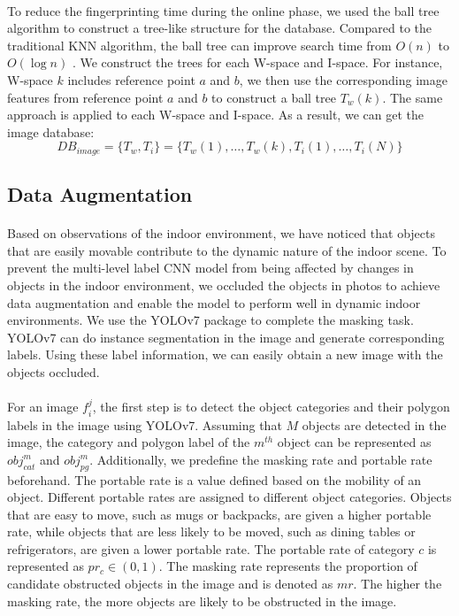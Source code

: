 \documentclass[a4paper,12pt]{report}
\begin{document}
\paragraph{}
To reduce the fingerprinting time during the online phase, we used the ball tree algorithm to construct a tree-like structure for the database. Compared to the traditional KNN algorithm, the ball tree can improve search time from $O(n)$ to $O(\log n)$ \cite{bhatia2010survey}. We construct the trees for each W-space and I-space. For instance, W-space $k$ includes reference point $a$ and $b$, we then use the corresponding image features from reference point $a$ and $b$ to construct a ball tree $T_w(k)$. The same approach is applied to each W-space and I-space. As a result, we can get the image database:
\begin{equation}
    \label{Eq:DB_image}
    DB_{image}=\{T_w,T_i\}=\{T_w(1),\dots,T_w(k),T_i(1),\dots,T_i(N)\}
\end{equation}
 
\subsection{Data Augmentation}
\paragraph{}
Based on observations of the indoor environment, we have noticed that objects that are easily movable contribute to the dynamic nature of the indoor scene. To prevent the multi-level label CNN model from being affected by changes in objects in the indoor environment, we occluded the objects in photos to achieve data augmentation and enable the model to perform well in dynamic indoor environments. We use the YOLOv7 \cite{wang2023yolov7} package to complete the masking task. YOLOv7 can do instance segmentation in the image and generate corresponding labels. Using these label information, we can easily obtain a new image with the objects occluded.
\paragraph{}
For an image $f_i^j$, the first step is to detect the object categories and their polygon labels in the image using YOLOv7. Assuming that $M$ objects are detected in the image, the category and polygon label of the $m^{th}$ object can be represented as $obj_{cat}^m$ and $obj_{pg}^m$. Additionally, we predefine the masking rate and portable rate beforehand. The portable rate is a value defined based on the mobility of an object. Different portable rates are assigned to different object categories. Objects that are easy to move, such as mugs or backpacks, are given a higher portable rate, while objects that are less likely to be moved, such as dining tables or refrigerators, are given a lower portable rate. The portable rate of category $c$ is represented as $pr_c\in(0,1)$. The masking rate represents the proportion of candidate obstructed objects in the image and is denoted as $mr$. The higher the masking rate, the more objects are likely to be obstructed in the image. 
\end{document}
